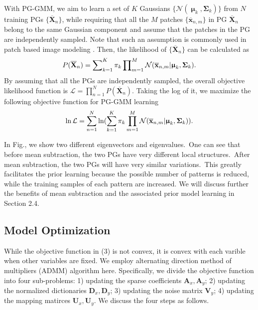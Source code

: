 \documentclass[10pt,twocolumn,letterpaper]{article}
\begin{document}
With PG-GMM, we aim to learn a set of $K$ Gaussians $\{\mathcal{N}(\boldsymbol{\upmu}_{k},\mathbf{\Sigma}_{k})\}$ from $N$ training PGs $\{\mathbf{\overline{X}}_{n}\}$, while requiring that all the $M$ patches $\{\mathbf{\overline{x}}_{n,m}\}$  in PG $\mathbf{\overline{X}}_{n}$ belong to the same Gaussian component and assume that the patches in the PG are independently sampled. Note that such an assumption is commonly used in patch based image modeling \cite{ksvd,lssc}. Then, the likelihood of $\{\mathbf{\overline{X}}_{n}\}$ can be calculated as
\begin{equation}\label{equ3}
\setlength{\abovedisplayskip}{3pt}
\setlength{\belowdisplayskip}{3pt}
P(\mathbf{\overline{X}}_{n})  = \sum\nolimits_{k=1}^{K}\pi_{k}\prod\nolimits_{m=1}^{M}\mathcal{N}(\mathbf{\overline{x}}_{n,m}|\boldsymbol{\upmu}_{k},\mathbf{\Sigma}_{k}).
\end{equation}
By assuming that all the PGs are independently sampled, the overall objective likelihood function is $\mathcal{L} = \prod_{n=1}^{N}P(\mathbf{\overline{X}}_{n})$. Taking the log of it, we maximize the following objective function for PG-GMM learning
\begin{equation}\label{equ4}
\setlength{\abovedisplayskip}{3pt}
\setlength{\belowdisplayskip}{3pt}
\begin{split}
\ln\mathcal{L}=\sum_{n=1}^{N} \ln(\sum_{k=1}^{K}\pi_{k}\prod_{m=1}^{M}\mathcal{N}(\mathbf{\overline{x}}_{n,m}|\boldsymbol{\upmu}_{k},\mathbf{\Sigma}_{k})).
\end{split}
\end{equation}

In Fig., we show two different eigenvectors and eigenvalues.\ One can see that before mean subtraction, the two PGs have very different local structures.\ After mean subtraction, the two PGs will have very similar variations.\ This greatly facilitates the prior learning because the possible number of patterns is reduced, while the training samples of each pattern are increased. We will discuss further the benefits of mean subtraction and the associated prior model learning in Section 2.4.  

\subsection{Model Optimization}
While the objective function in (3) is not convex, it is convex with each varible when other variables are fixed. We employ alternating direction method of multipliers (ADMM) algorithm here. Specifically, we divide the objective function into four sub-problems: 1) updating the sparse coefficients $\mathbf{A}_{x}, \mathbf{A}_{y}$; 2) updating the normalized dictionaries $\mathbf{D}_{x}, \mathbf{D}_{y}$; 3) updating the noise matrix $\mathbf{V}_{y}$; 4) updating the mapping matirces $\mathbf{U}_{x}, \mathbf{U}_{y}$. We discuss the four steps as follows.
\end{document}
